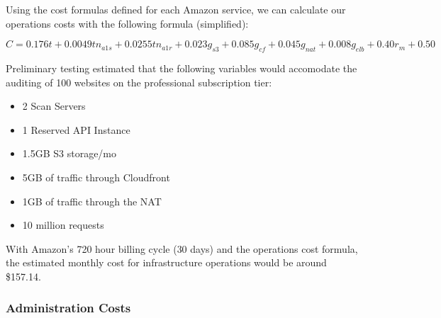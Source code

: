 \noindent
Using the cost formulas defined for each Amazon service, we can calculate our operations costs with the following formula (simplified):

\[
  C = 0.176t + 0.0049tn_{a1s} + 0.0255tn_{a1r} + 0.023g_{s3} + 0.085g_{cf} + 0.045g_{nat} + 0.008g_{elb} + 0.40r_{m} + 0.50
\]

\noindent
Preliminary testing estimated that the following variables would accomodate the auditing of 100 websites on the professional subscription tier:

\begin{itemize}

\item 2 Scan Servers
\item 1 Reserved API Instance
\item 1.5GB S3 storage/mo
\item 5GB of traffic through Cloudfront
\item 1GB of traffic through the NAT
\item 10 million requests

\end{itemize}

\noindent
With Amazon's 720 hour billing cycle (30 days) \cite{aws.calc.2020} and the operations cost formula, the estimated monthly cost for infrastructure operations would be around \$157.14.

\subsubsection{Administration Costs} \label{section.admin.costs}

